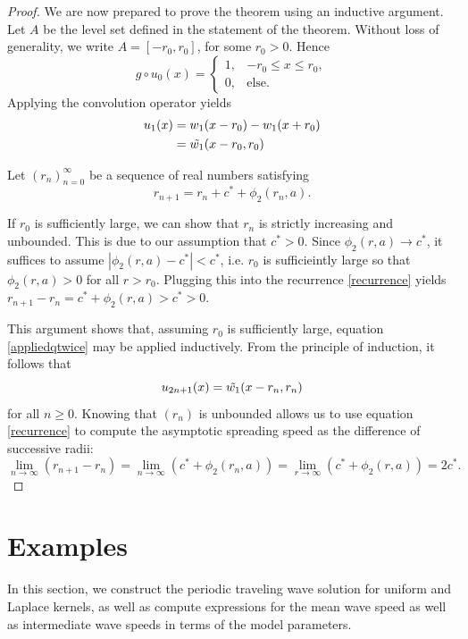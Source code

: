 \documentclass[11pt]{article}
\theoremstyle{definition}
\numberwithin{equation}{section}
\numberwithin{thm}{section}
\begin{document}
\begin{proof}
We are now prepared to prove the theorem using an inductive argument. Let $A$ be the level set defined in the statement of the theorem. Without loss of generality, we write $A=[-r_0,r_0]$, for some $r_0>0$. Hence
$$
g \circ u_0(x) = \begin{cases}
1, & -r_0 \leq x \leq r_0, \\
0, & \text{else}.
\end{cases}
$$
Applying the convolution operator yields
$$ \begin{aligned}
u_1(x) &= w_1(x-r_0) - w_1(x+r_0) \\
&= \tilde{w_1}(x-r_0,r_0)
\end{aligned}
$$

Let $(r_n)_{n=0}^{\infty}$ be a sequence of real numbers satisfying
\begin{equation} \label{recurrence}
r_{n+1} = r_n + c^* + \phi_2(r_n,a).
\end{equation}

If $r_0$ is sufficiently large, we can show that $r_n$ is strictly increasing and unbounded. This is due to our assumption that $c^*>0$. Since $\phi_2(r,a)\to c^*$, it suffices to assume  $|\phi_2(r,a)-c^*|<c^*$, i.e. $r_0$ is sufficieintly large so that $\phi_2(r,a)>0$ for all $r>r_0$. Plugging this into the recurrence \eqref{recurrence} yields $r_{n+1}-r_n = c^* + \phi_2(r,a) > c^* > 0$.

This argument shows that, assuming $r_0$ is sufficiently large, equation \eqref{appliedqtwice} may be applied inductively. From the principle of induction, it follows that
$$
u_{2n+1}(x) = \tilde{w_1}(x-r_n,r_n)
$$
for all $n \geq 0$. Knowing that $(r_n)$ is unbounded allows us to use equation \eqref{recurrence} to compute the asymptotic spreading speed as the difference of successive radii:
$$
\lim_{n\to\infty} (r_{n+1}-r_n) = \lim_{n\to\infty} (c^* + \phi_2(r_n,a)) = \lim_{r\to\infty} ( c^* + \phi_2(r,a)) = 2c^*.
$$

\end{proof}



\section{Examples}

In this section, we construct the periodic traveling wave solution for uniform and Laplace kernels, as well as compute expressions for the mean wave speed as well as intermediate wave speeds in terms of the model parameters.
\end{document}
